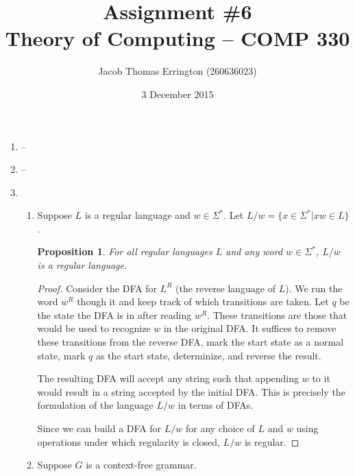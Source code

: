 \documentclass[letterpaper,11pt]{article}
\author{Jacob Thomas Errington (260636023)}
\title{Assignment \#6\\Theory of Computing -- COMP 330}
\date{3 December 2015}
\newtheorem{proposition}{Proposition}
\begin{document}
\maketitle

\begin{enumerate}
    \item --

    \item --

    \item
        \begin{enumerate}
            \item
                Suppose $L$ is a regular language and $w \in \Sigma^*$. Let
                $L/w = \{x \in \Sigma^* | xw \in L\}$.

                \begin{proposition}
                    For all regular languages $L$ and any word $w \in
                    \Sigma^*$, $L/w$ is a regular language.
                \end{proposition}

                \begin{proof}
                    Consider the DFA for $L^R$ (the reverse language of $L$).
                    We run the word $w^R$ though it and keep track of which
                    transitions are taken. Let $q$ be the state the DFA is in
                    after reading $w^R$.  These transitions are those that
                    would be used to recognize $w$ in the original DFA. It
                    suffices to remove these transitions from the reverse DFA,
                    mark the start state as a normal state, mark $q$ as the
                    start state, determinize, and reverse the result.

                    The resulting DFA will accept any string such that
                    appending $w$ to it would result in a string accepted by
                    the initial DFA.  This is precisely the formulation of the
                    language $L/w$ in terms of DFAs.

                    Since we can build a DFA for $L/w$ for any choice of $L$
                    and $w$ using operations under which regularity is closed,
                    $L/w$ is regular.
                \end{proof}

            \item
                Suppose $G$ is a context-free grammar.


\end{enumerate}
\end{enumerate}
\end{document}
